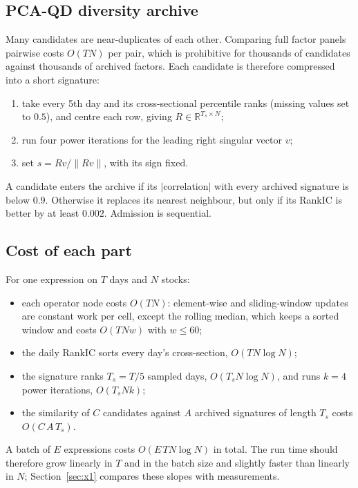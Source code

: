 \documentclass[11pt,a4paper]{article}
\begin{document}
\subsection{PCA-QD diversity archive}
\label{sec:pcaqd}
Many candidates are near-duplicates of each other. Comparing full factor panels pairwise costs $O(TN)$ per pair, which is prohibitive for thousands of candidates against thousands of archived factors. Each candidate is therefore compressed into a short signature:
\begin{enumerate}[nosep]
  \item take every 5th day and its cross-sectional percentile ranks (missing values set to $0.5$), and centre each row, giving $R\in\mathbb{R}^{T_s\times N}$;
  \item run four power iterations for the leading right singular vector $v$;
  \item set $s = Rv/\|Rv\|$, with its sign fixed.
\end{enumerate}
A candidate enters the archive if its $|$correlation$|$ with every archived signature is below $0.9$. Otherwise it replaces its nearest neighbour, but only if its RankIC is better by at least $0.002$. Admission is sequential.

\subsection{Cost of each part}
\label{sec:cost}
For one expression on $T$ days and $N$ stocks:
\begin{itemize}[nosep]
  \item each operator node costs $O(TN)$: element-wise and sliding-window updates are constant work per cell, except the rolling median, which keeps a sorted window and costs $O(TNw)$ with $w\le60$;
  \item the daily RankIC sorts every day's cross-section, $O(TN\log N)$;
  \item the signature ranks $T_s=T/5$ sampled days, $O(T_s N\log N)$, and runs $k=4$ power iterations, $O(T_s N k)$;
  \item the similarity of $C$ candidates against $A$ archived signatures of length $T_s$ costs $O(C\,A\,T_s)$.
\end{itemize}
A batch of $E$ expressions costs $O(E\,TN\log N)$ in total. The run time should therefore grow linearly in $T$ and in the batch size and slightly faster than linearly in $N$; Section~\ref{sec:x1} compares these slopes with measurements.
\end{document}
